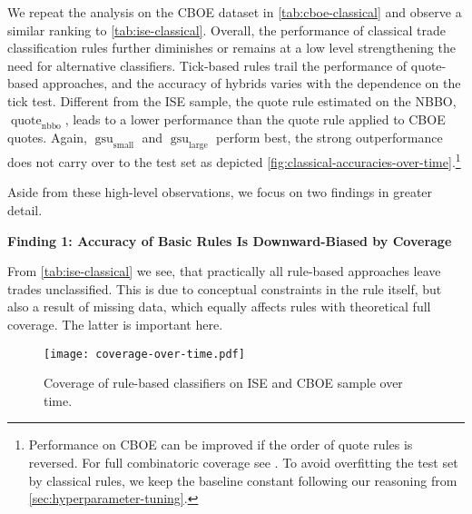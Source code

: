 We repeat the analysis on the \gls{CBOE} dataset in \cref{tab:cboe-classical} and observe a similar ranking to \cref{tab:ise-classical}. Overall, the performance of classical trade classification rules further diminishes or remains at a low level strengthening the need for alternative classifiers. Tick-based rules trail the performance of quote-based approaches, and the accuracy of hybrids varies with the dependence on the tick test. Different from the \gls{ISE} sample, the quote rule estimated on the \gls{NBBO}, $\operatorname{quote}_{\mathrm{nbbo}}$, leads to a lower performance than the quote rule applied to \gls{CBOE} quotes.
Again, $\operatorname{gsu}_{\mathrm{small}}$ and $\operatorname{gsu}_{\mathrm{large}}$ perform best, the strong outperformance does not carry over to the test set as depicted \cref{fig:classical-accuracies-over-time}.\footnote{Performance on \gls{CBOE} can be improved if the order of quote rules is reversed. For full combinatoric coverage see \textcite[][33]{grauerOptionTradeClassification2022}. To avoid overfitting the test set by classical rules, we keep the baseline constant following our reasoning from \cref{sec:hyperparameter-tuning}.}

Aside from these high-level observations, we focus on two findings in greater detail.

\textbf{Finding 1: Accuracy of Basic Rules Is Downward-Biased by Coverage}

From \cref{tab:ise-classical} we see, that practically all rule-based approaches leave trades unclassified. This is due to conceptual constraints in the rule itself, but also a result of missing data, which equally affects rules with theoretical full coverage. The latter is important here.

\begin{figure}[!h]
    \centering
    \texttt{[image: coverage-over-time.pdf]}
    \caption[Coverage Of Rule-Based Classifiers On  and  Over Time]{Coverage of rule-based classifiers on \gls{ISE} and \gls{CBOE} sample over time.}
    \label{fig:classical-coverage-over-time}
\end{figure}

